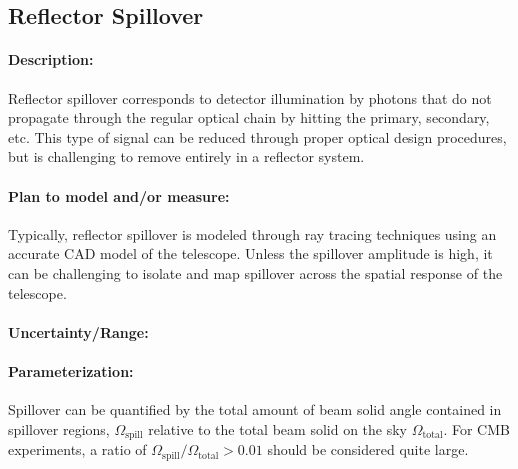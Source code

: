 \subsection{Reflector Spillover}

\paragraph{Description:}
Reflector spillover corresponds to detector illumination by photons that do not propagate through the regular optical chain by hitting the primary, secondary, etc. This type of signal can be reduced through proper optical design procedures, but is challenging to remove entirely in a reflector system.

\paragraph{Plan to model and/or measure:}
Typically, reflector spillover is modeled through ray tracing techniques using an accurate CAD model of the telescope. Unless the spillover amplitude is high, it can be challenging to isolate and map spillover across the spatial response of the telescope.

\paragraph{Uncertainty/Range:}

\paragraph{Parameterization:}
Spillover can be quantified by the total amount of beam solid angle contained in spillover regions, $\Omega _\mathrm{spill}$ relative to the total beam solid on the sky $\Omega _\mathrm{total}$. For CMB experiments, a ratio of $\Omega _\mathrm{spill} / \Omega _\mathrm{total} > 0.01$ should be considered quite large.
